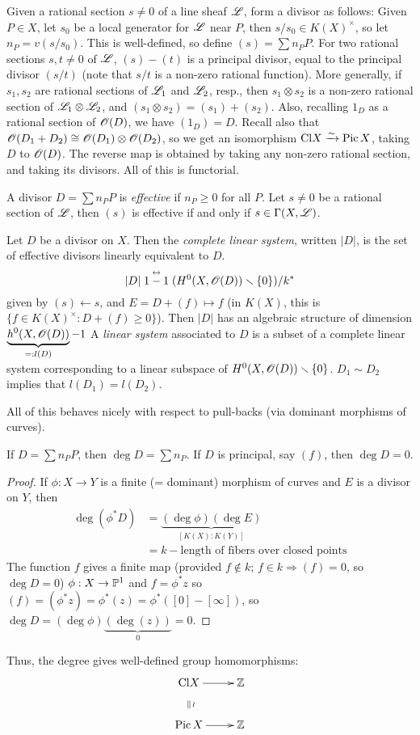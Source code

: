  Given a rational section $s\not=0$ of a line sheaf $\L$, form a
 divisor as follows:  Given $P\in X$, let $s_0$ be a local
 generator for $\L$ near $P$, then $s/s_0\in K(X)^{\times}$, so
 let $n_P=v(s/s_0)$.  This is well-defined, so define $(s)=\sum
 n_P P$.  For two rational sections $s,t\not=0$ of $\L$, $(s)-(t)$ is
 a principal divisor, equal to the principal divisor $(s/t)$ (note
 that $s/t$ is a non-zero rational function).  More generally, if
 $s_1,s_2$ are rational sections of $\L_1$ and $\L_2$, resp., then
 $s_1\otimes s_2$ is a non-zero rational section of $\L_1\otimes
 \L_2$, and $(s_1\otimes s_2)=(s_1)+(s_2)$.  Also, recalling $1_D$
 as a rational section of $\O(D)$, we have $(1_D)=D$.  Recall also
 that $\O(D_1+D_2)\cong \O(D_1)\otimes \O(D_2)$, so we get an
 isomorphism $\cl X \xrightarrow{\sim} \pic X$, taking $D$ to
 $\O(D)$.  The reverse map is obtained by taking any non-zero
 rational section, and taking its divisors.  All of this is
 functorial.

 A divisor $D=\sum n_P P$ is \emph{effective} if $n_P\ge 0$ for
 all $P$.  Let $s\not=0$ be a rational section of $\L$, then $(s)$
 is effective if and only if $s\in \Gamma(X,\L)$.

 \begin{definition}
 Let $D$ be a divisor on $X$.  Then the \emph{complete linear
 system}, written $|D|$, is the set of effective divisors linearly
 equivalent to $D$.
 \[
    |D|\buildrel{\leftrightarrow}\over{1-1} (H^0(X,\O(D))\smallsetminus \{0\})/k^*
 \]
 given by $(s)\leftarrow s$, and $E=D+(f)\mapsto f$ (in $K(X)$,
 this is $\{f\in K(X)^{\times}: D+(f)\ge 0\} $).  Then $|D|$ has an
 algebraic structure of dimension
 $\underbrace{h^0(X,\O(D))}_{=:l(D)}-1$  A \emph{linear system}
 associated to $D$ is a subset of a complete linear system
 corresponding to a linear subspace of
 $H^0(X,\O(D))\smallsetminus\{0\}$.  $D_1\sim D_2$ implies that
 $l(D_1)=l(D_2)$.
 \end{definition}
 All of this behaves nicely with respect to pull-backs (via
 dominant morphisms of curves).

 \begin{definition}
 If $D=\sum n_P P$, then $\deg D=\sum n_P$.  If $D$ is principal,
 say $(f)$, then $\deg D=0$.
 \end{definition}
 \begin{proof}
 If $\phi:X\to Y$ is a finite (= dominant) morphism of curves and
 $E$ is a divisor on $Y$, then
 \begin{align*}
    \deg(\phi^* D) &= \underbrace{(\deg \phi)(\deg
    E)}_{[K(X):K(Y)]}\\
    &= k- \text{length of fibers over closed points}
 \end{align*}
 The function $f$ gives a finite map (provided $f\not\in k$; $f\in k\Rightarrow (f)=0$, so $\deg
 D=0$) $\phi:X\to \P^1$ and $f=\phi^*z$ so
 $(f)=(\phi^*z)=\phi^*(z) = \phi^*([0]-[\infty])$, so $\deg D =
 (\deg \phi)\underbrace{(\deg (z))}_0 = 0$.
 \end{proof}
 Thus, the degree gives well-defined group homomorphisms:
 \[\xymatrix{
    \cl X\ar[r]\ar@{}[d]|{\parallel}^{\wr} & \Z\\
    \pic X\ar[r] & \Z
 }\]


